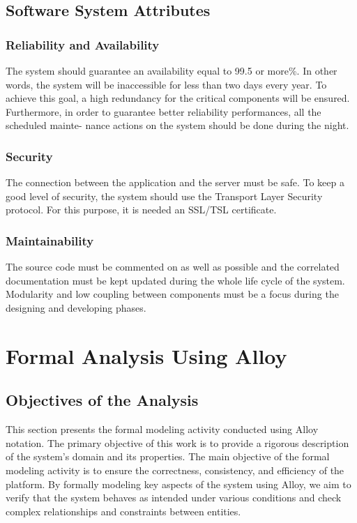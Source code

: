 \documentclass[a4paper,12pt]{article}
\begin{document}
\subsection{Software System Attributes}

\subsubsection{Reliability and Availability}
The system should guarantee an availability equal to 99.5 or more\%. In
other words, the system will be inaccessible for less than two days every year. To achieve this
goal, a high redundancy for the critical components will be ensured.
Furthermore, in order to guarantee better reliability performances, all the scheduled mainte-
nance actions on the system should be done during the night.
\subsubsection{Security}
The connection between the application and the server must be safe. To keep a good level of
security, the system should use the Transport Layer Security protocol. For this purpose, it is
needed an SSL/TSL certificate.
\subsubsection{Maintainability}
The source code must be commented on as well as possible and the correlated documentation
must be kept updated during the whole life cycle of the system.
Modularity and low coupling between components must be a focus during the designing and
developing phases.

\section{Formal Analysis Using Alloy}
\subsection{Objectives of the Analysis}
This section presents the formal modeling activity conducted using Alloy notation. The primary objective of this work is to provide a rigorous description of the system's domain and its properties.
The main objective of the formal modeling activity is to ensure the correctness, consistency, and efficiency of the platform. By formally modeling key aspects of the system using Alloy, we aim to verify that the system behaves as intended under various conditions and check complex relationships and constraints between entities.
\end{document}
